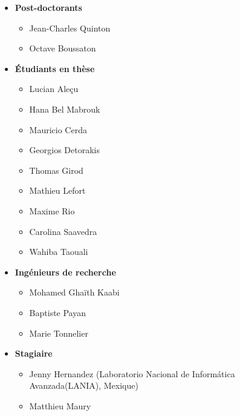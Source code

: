 \begin{multicols}{2}
\begin{itemize}
   \item \textbf{Post-doctorants}
      \begin{itemize}
         \item  Jean-Charles Quinton
         \item  Octave Boussaton
      \end{itemize}
   \item \textbf{Étudiants en thèse}
      \begin{itemize}
         \item Lucian Aleçu
         \item Hana Bel Mabrouk
         \item Mauricio Cerda
         \item Georgios Detorakis
         \item Thomas Girod
         \item Mathieu Lefort
         \item Maxime Rio
         \item Carolina Saavedra
         \item Wahiba Taouali
      \end{itemize}
   \item \textbf{Ingénieurs de recherche}
      \begin{itemize}
         \item Mohamed Ghaïth Kaabi
         \item Baptiste Payan
         \item Marie Tonnelier
      \end{itemize}
   \item \textbf{Stagiaire}
      \begin{itemize}
         \item Jenny Hernandez (Laboratorio Nacional de Informática Avanzada(LANIA), Mexique)
         \item Matthieu Maury
      \end{itemize}
\end{itemize}
\end{multicols}




